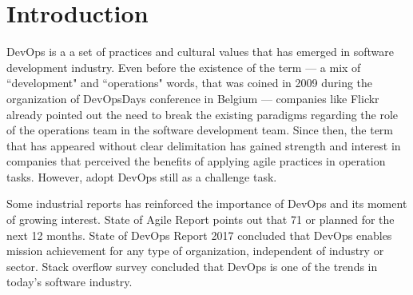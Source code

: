 \section{Introduction}

DevOps is a a set of practices and cultural values that has emerged in software
development industry. Even before
the existence of the term --- a mix of ``development" and ``operations" words,
that was coined in 2009 during the organization of DevOpsDays conference in
Belgium \cite{httermann2012devops} %
--- companies like Flickr \cite{flickr} already pointed out the need to break
the existing paradigms regarding the role of the operations team in the
software development team. Since then, the term that has appeared without clear
delimitation has gained strength and interest in companies that perceived the
benefits of applying agile practices in operation tasks.
However, adopt DevOps still as a challenge task.


Some industrial reports has reinforced the importance of DevOps and its moment
of growing interest. State of Agile Report \cite{state_of_agile} points out
that 71%
or planned for the next 12 months. State of DevOps Report
\cite{state_of_devops} 2017 concluded that DevOps enables mission achievement
for any type of organization, independent of industry or sector. Stack overflow
survey \cite{stackoverflow_2018} concluded that DevOps is one of the trends in
today's software industry.

